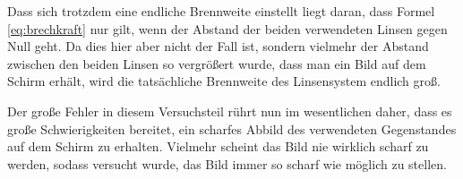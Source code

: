 Dass sich trotzdem eine endliche Brennweite einstellt liegt daran, dass Formel \eqref{eq:brechkraft} nur gilt, wenn der Abstand der beiden verwendeten Linsen gegen Null geht. Da dies hier aber nicht der Fall ist, sondern vielmehr der Abstand zwischen den beiden Linsen so vergrößert wurde, dass man ein Bild auf dem Schirm erhält, wird die tatsächliche Brennweite des Linsensystem endlich groß.

Der große Fehler in diesem Versuchsteil rührt nun im wesentlichen daher, dass es große Schwierigkeiten bereitet, ein scharfes Abbild des verwendeten Gegenstandes auf dem Schirm zu erhalten. Vielmehr scheint das Bild nie wirklich scharf zu werden, sodass versucht wurde, das Bild immer so scharf wie möglich zu stellen.